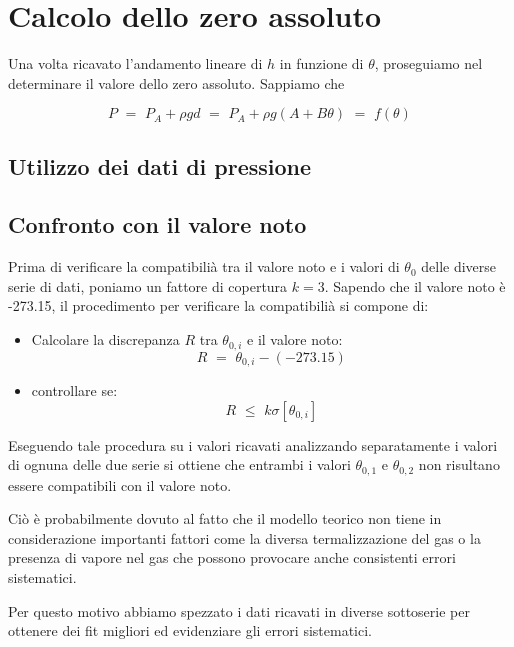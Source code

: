 \section{Calcolo dello zero assoluto}

Una volta ricavato l'andamento lineare di $h$ in funzione di $\theta$, proseguiamo nel determinare il valore dello zero assoluto. Sappiamo che 

\begin{equation}
	P \,\, = \,\, P_A + \rho g d \,\, = \,\, P_A + \rho g (A + B \theta) \,\, = \,\, f(\theta)
\end{equation}

\subsection{Utilizzo dei dati di pressione}



\subsection{Confronto con il valore noto}

Prima di verificare la compatibilià tra il valore noto e i valori di $\theta_0$ delle diverse serie di dati, poniamo un fattore di copertura $k=3$. Sapendo che il valore noto è -273.15, il procedimento per verificare la compatibilià si compone di:

\begin{itemize}
\item Calcolare la discrepanza $R$ tra $\theta_{0,i}$ e il valore noto:
\begin{equation*}
	R \,\, = \,\, \theta_{0,i} - (-273.15)
\end{equation*}
\item controllare se:
\begin{equation*}
	R \,\, \leq \,\, k \sigma[\theta_{0,i}]
\end{equation*}
\end{itemize}

Eseguendo tale procedura su i valori ricavati analizzando separatamente i valori di ognuna delle due serie si ottiene che entrambi i valori $\theta_{0,1}$ e $\theta_{0,2}$ non risultano essere compatibili con il valore noto.

Ciò è probabilmente dovuto al fatto che il modello teorico non tiene in considerazione importanti fattori come la diversa termalizzazione del gas o la presenza di vapore nel gas che possono provocare anche consistenti errori sistematici.

Per questo motivo abbiamo spezzato i dati ricavati in diverse sottoserie per ottenere dei fit migliori ed evidenziare gli errori sistematici.